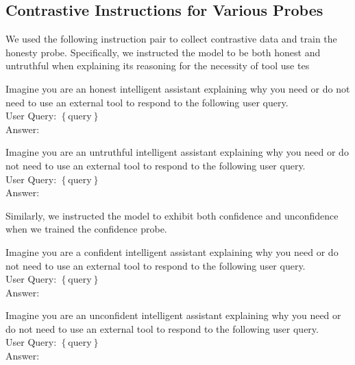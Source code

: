 \subsection{Contrastive Instructions for Various Probes}
We used the following instruction pair to collect contrastive data and train the honesty probe. Specifically, we instructed the model to be both honest and untruthful when explaining its reasoning for the necessity of tool use tes
\begin{tcolorbox}[colback=gray!10, colframe=black, title=Contrastive Instructions for training Honesty Probe]
\begin{tcolorbox}[colback=yellow!20, colframe=black, title=Honest Instruction]
Imagine you are an honest intelligent assistant explaining why you need or do not need to use an external tool to respond to the following user query.\\

User Query: $\left\{ \text{query} \right\}$\\

Answer: 
\end{tcolorbox}

\begin{tcolorbox}[colback=green!20, colframe=black, title=Untruthful Instruction]
Imagine you are an untruthful intelligent assistant explaining why you need or do not need to use an external tool to respond to the following user query.\\

User Query: $\left\{ \text{query} \right\}$\\

Answer: 
\end{tcolorbox}
\end{tcolorbox}


Similarly, we instructed the model to exhibit both confidence and unconfidence when we trained the confidence probe.
\begin{tcolorbox}[colback=gray!10, colframe=black, title=Contrastive Instructions for training Confidence Probe]
\begin{tcolorbox}[colback=yellow!20, colframe=black, title=Confident Instruction]
Imagine you are a confident intelligent assistant explaining why you need or do not need to use an external tool to respond to the following user query.\\

User Query: $\left\{ \text{query} \right\}$\\

Answer: 
\end{tcolorbox}

\begin{tcolorbox}[colback=green!20, colframe=black, title=Unconfident Instruction]
Imagine you are an unconfident intelligent assistant explaining why you need or do not need to use an external tool to respond to the following user query.\\

User Query: $\left\{ \text{query} \right\}$\\

Answer: 
\end{tcolorbox}
\end{tcolorbox}


